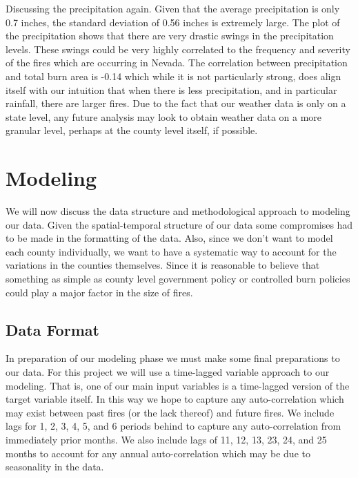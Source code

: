 \documentclass[12pt]{article}
\begin{document}
Discussing the precipitation again. Given that the average precipitation is only 0.7 inches, the standard deviation of 0.56 inches is extremely large. The plot of the precipitation shows that there are very drastic swings in the precipitation levels. These swings could be very highly correlated to the frequency and severity of the fires which are occurring in Nevada. The correlation between precipitation and total burn area is -0.14 which while it is not particularly strong, does align itself with our intuition that when there is less precipitation, and in particular rainfall, there are larger fires. Due to the fact that our weather data is only on a state level, any future analysis may look to obtain weather data on a more granular level, perhaps at the county level itself, if possible. 

\section{\textrm{Modeling}}

We will now discuss the data structure and methodological approach to modeling our data. Given the spatial-temporal structure of our data some compromises had to be made in the formatting of the data. Also, since we don't want to model each county individually, we want to have a systematic way to account for the variations in the counties themselves. Since it is reasonable to believe that something as simple as county level government policy or controlled burn policies could play a major factor in the size of fires. 

\subsection{\textrm{Data Format}}

In preparation of our modeling phase we must make some final preparations to our data. For this project we will use a time-lagged variable approach to our modeling. That is, one of our main input variables is a time-lagged version of the target variable itself. In this way we hope to capture any auto-correlation which may exist between past fires (or the lack thereof) and future fires. We include lags for 1, 2, 3, 4, 5, and 6 periods behind to capture any auto-correlation from immediately prior months. We also include lags of 11, 12, 13, 23, 24, and 25 months to account for any annual auto-correlation which may be due to seasonality in the data. \\
\end{document}
